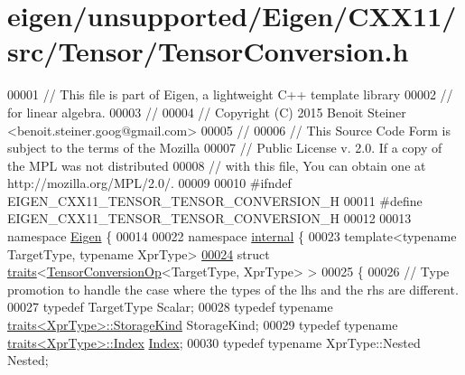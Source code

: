 \hypertarget{eigen_2unsupported_2_eigen_2_c_x_x11_2src_2_tensor_2_tensor_conversion_8h_source}{}\section{eigen/unsupported/\+Eigen/\+C\+X\+X11/src/\+Tensor/\+Tensor\+Conversion.h}
\label{eigen_2unsupported_2_eigen_2_c_x_x11_2src_2_tensor_2_tensor_conversion_8h_source}

\begin{DoxyCode}
00001 \textcolor{comment}{// This file is part of Eigen, a lightweight C++ template library}
00002 \textcolor{comment}{// for linear algebra.}
00003 \textcolor{comment}{//}
00004 \textcolor{comment}{// Copyright (C) 2015 Benoit Steiner <benoit.steiner.goog@gmail.com>}
00005 \textcolor{comment}{//}
00006 \textcolor{comment}{// This Source Code Form is subject to the terms of the Mozilla}
00007 \textcolor{comment}{// Public License v. 2.0. If a copy of the MPL was not distributed}
00008 \textcolor{comment}{// with this file, You can obtain one at http://mozilla.org/MPL/2.0/.}
00009 
00010 \textcolor{preprocessor}{#ifndef EIGEN\_CXX11\_TENSOR\_TENSOR\_CONVERSION\_H}
00011 \textcolor{preprocessor}{#define EIGEN\_CXX11\_TENSOR\_TENSOR\_CONVERSION\_H}
00012 
00013 \textcolor{keyword}{namespace }\hyperlink{namespace_eigen}{Eigen} \{
00014 
00022 \textcolor{keyword}{namespace }\hyperlink{namespaceinternal}{internal} \{
00023 \textcolor{keyword}{template}<\textcolor{keyword}{typename} TargetType, \textcolor{keyword}{typename} XprType>
\hyperlink{struct_eigen_1_1internal_1_1traits_3_01_tensor_conversion_op_3_01_target_type_00_01_xpr_type_01_4_01_4}{00024} \textcolor{keyword}{struct }\hyperlink{struct_eigen_1_1internal_1_1traits}{traits}<\hyperlink{class_eigen_1_1_tensor_conversion_op}{TensorConversionOp}<TargetType, XprType> >
00025 \{
00026   \textcolor{comment}{// Type promotion to handle the case where the types of the lhs and the rhs are different.}
00027   \textcolor{keyword}{typedef} TargetType Scalar;
00028   \textcolor{keyword}{typedef} \textcolor{keyword}{typename} \hyperlink{struct_eigen_1_1internal_1_1traits}{traits<XprType>::StorageKind} StorageKind;
00029   \textcolor{keyword}{typedef} \textcolor{keyword}{typename} \hyperlink{struct_eigen_1_1internal_1_1traits}{traits<XprType>::Index} \hyperlink{namespace_eigen_a62e77e0933482dafde8fe197d9a2cfde}{Index};
00030   \textcolor{keyword}{typedef} \textcolor{keyword}{typename} XprType::Nested Nested;

\end{DoxyCode}
